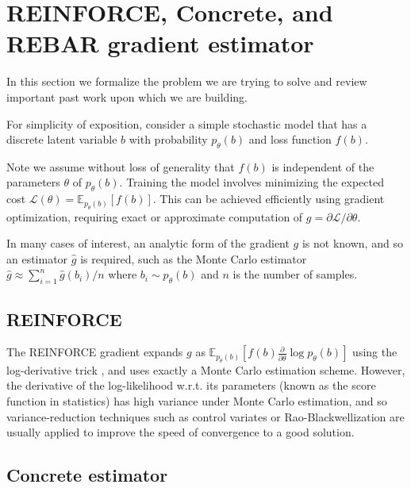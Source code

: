 \documentclass{article}
\newcommand{\discreteDist}{p_{\theta}(b)}
\newcommand{\loss}{f(b)}
\newcommand{\lossGrad}{\loss{} \frac{\partial}{\partial \theta }\log \discreteDist{}}
\newcommand{\mcGrad}{\hat{g}}
\newcommand{\expectedLoss}{\mathbb{E}_{\discreteDist{}}[\loss{}]}
\newcommand{\expectedLossLogTrick}{\mathbb{E}_{\discreteDist{}}[\lossGrad{}]}
\begin{document}
\section{REINFORCE, Concrete, and REBAR gradient estimator}
In this section we formalize the problem we are trying to solve and review important past work upon which we are building.

For simplicity of exposition, consider a simple stochastic model that has a discrete latent variable $b$ with probability $\discreteDist{}$ and loss function $\loss{}$.

Note we assume without loss of generality that $\loss{}$ is independent of the parameters  $\theta$ of $\discreteDist{}$.
Training the model involves minimizing the expected cost $\mathcal{L}(\theta)=\expectedLoss{}$.
This can be achieved efficiently using gradient optimization, requiring exact or approximate computation of $g=\partial\mathcal{L} / {\partial \theta}$.

In many cases of interest, an analytic form of the gradient $g$ is not known, and so an estimator $\mcGrad{}$ is required, such as the Monte Carlo estimator $\mcGrad{}\approx \sum_{i=1}^n\hat{g}(b_i) / n$ where $b_i\sim \discreteDist{}$ and $n$ is the number of samples. 

\subsection{REINFORCE}


The REINFORCE gradient \cite{williams1992simple} expands $g$ as $\expectedLossLogTrick{}$ using the log-derivative trick \cite{LOG DERIVITIVE TRICK}, and uses exactly a Monte Carlo estimation scheme. 
However, the derivative of the log-likelihood w.r.t. its parameters (known as the score function in statistics) has high variance under Monte Carlo estimation, and so variance-reduction techniques such as control variates or Rao-Blackwellization are usually applied to improve the speed of convergence to a good solution.

\subsection{Concrete estimator}
\end{document}
